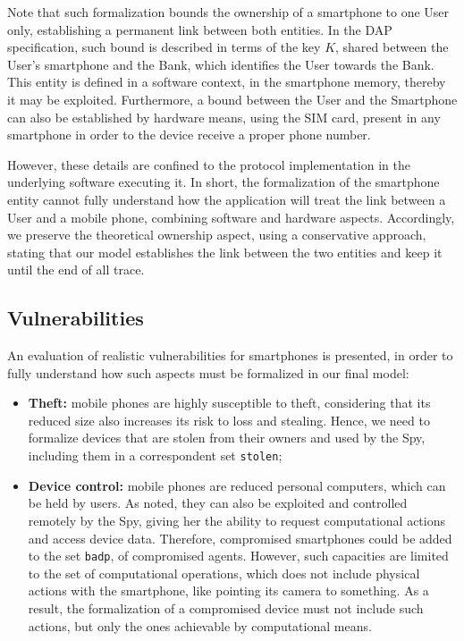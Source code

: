 Note that such formalization bounds the ownership of a smartphone to one User only, establishing a permanent link between both entities. In the DAP specification, such bound is described in terms of the key $K$, shared between the User's smartphone and the Bank, which identifies the User towards the Bank. This entity is defined in a software context, in the smartphone memory, thereby it may be exploited. Furthermore, a bound between the User and the Smartphone can also be established by hardware means, using the SIM card, present in any smartphone in order to the device receive a proper phone number.

However, these details are confined to the protocol implementation in the underlying software executing it. In short, the formalization of the smartphone entity cannot fully understand how the application will treat the link between a User and a mobile phone, combining software and hardware aspects. Accordingly, we preserve the theoretical ownership aspect, using a conservative approach, stating that our model establishes the link between the two entities and keep it until the end of all trace.



\subsection{Vulnerabilities}
An evaluation of realistic vulnerabilities for smartphones is presented, in order to fully understand how such aspects must be formalized in our final model:

\begin{itemize}
  \item \textbf{Theft:} mobile phones are highly susceptible to theft, considering that its reduced size also increases its risk to loss and stealing. Hence, we need to formalize devices that are stolen from their owners and used by the Spy, including them in a correspondent set \texttt{stolen};

  \item \textbf{Device control:} mobile phones are reduced personal computers, which can be held by users. As noted, they can also be exploited and controlled remotely by the Spy, giving her the ability to request computational actions and access device data. Therefore, compromised smartphones could be added to the set \texttt{badp}, of compromised agents. However, such capacities are limited to the set of computational operations, which does not include physical actions with the smartphone, like pointing its camera to something. As a result, the formalization of a compromised device must not include such actions, but only the ones achievable by computational means.
\end{itemize}

